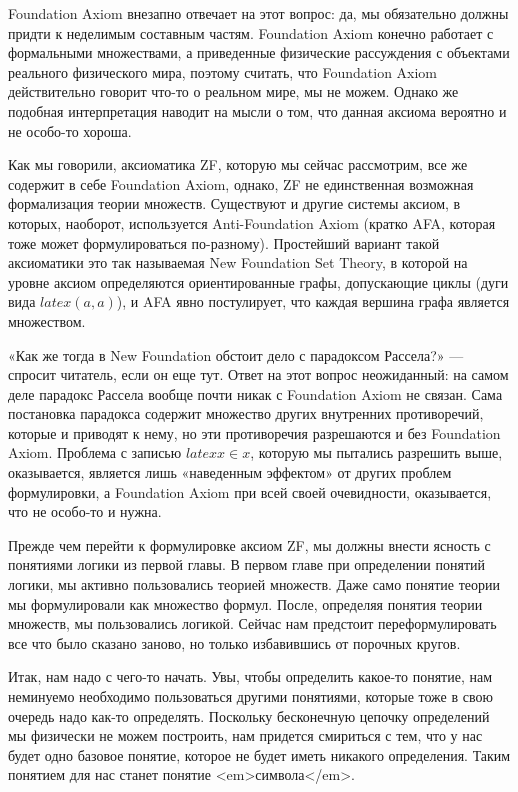 Foundation Axiom внезапно отвечает на этот вопрос: да, мы обязательно должны придти к неделимым составным частям. Foundation Axiom конечно работает с формальными множествами, а приведенные физические рассуждения с объектами реального физического мира, поэтому считать, что Foundation Axiom действительно говорит что-то о реальном мире, мы не можем. Однако же подобная интерпретация наводит на мысли о том, что данная аксиома вероятно и не особо-то хороша.

Как мы говорили, аксиоматика ZF, которую мы сейчас рассмотрим, все же содержит в себе Foundation Axiom, однако, ZF не единственная возможная формализация теории множеств. Существуют и другие системы аксиом, в которых, наоборот, используется Anti-Foundation Axiom (кратко AFA, которая тоже может формулироваться по-разному). Простейший вариант такой аксиоматики это так называемая New Foundation Set Theory, в которой на уровне аксиом определяются ориентированные графы, допускающие циклы (дуги вида $latex (a, a)$), и AFA явно постулирует, что каждая вершина графа является множеством.

«Как же тогда в New Foundation обстоит дело с парадоксом Рассела?» — спросит читатель, если он еще тут. Ответ на этот вопрос неожиданный: на самом деле парадокс Рассела вообще почти никак с Foundation Axiom не связан. Сама постановка парадокса содержит множество других внутренних противоречий, которые и приводят к нему, но эти противоречия разрешаются и без Foundation Axiom. Проблема с записью $latex x\in x$, которую мы пытались разрешить выше, оказывается, является лишь «наведенным эффектом» от других проблем формулировки, а Foundation Axiom при всей своей очевидности, оказывается, что не особо-то и нужна.

Прежде чем перейти к формулировке аксиом ZF, мы должны внести ясность с понятиями логики из первой главы. В первом главе при определении понятий логики, мы активно пользовались теорией множеств. Даже само понятие теории мы формулировали как множество формул. После, определяя понятия теории множеств, мы пользовались логикой. Сейчас нам предстоит переформулировать все что было сказано заново, но только избавившись от порочных кругов.

Итак, нам надо с чего-то начать. Увы, чтобы определить какое-то понятие, нам неминуемо необходимо пользоваться другими понятиями, которые тоже в свою очередь надо как-то определять. Поскольку бесконечную цепочку определений мы физически не можем построить, нам придется смириться с тем, что у нас будет одно базовое понятие, которое не будет иметь никакого определения. Таким понятием для нас станет понятие <em>символа</em>.

